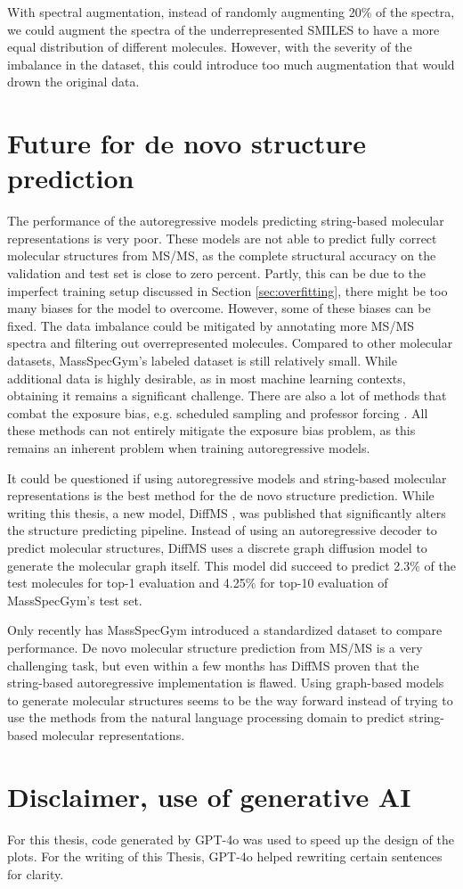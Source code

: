 With spectral augmentation, instead of randomly augmenting 20\% of the spectra, we could augment the spectra of the underrepresented SMILES to have a more equal distribution of different molecules.
However, with the severity of the imbalance in the dataset, this could introduce too much augmentation that would drown the original data.

\section{Future for de novo structure prediction}

The performance of the autoregressive models predicting string-based molecular representations is very poor.
These models are not able to predict fully correct molecular structures from \ac{MS/MS}, as the complete structural accuracy on the validation and test set is close to zero percent.
Partly, this can be due to the imperfect training setup discussed in Section \ref{sec:overfitting}, there might be too many biases for the model to overcome.
However, some of these biases can be fixed.
The data imbalance could be mitigated by annotating more \ac{MS/MS} spectra and filtering out overrepresented molecules.
Compared to other molecular datasets, MassSpecGym's labeled dataset is still relatively small.
While additional data is highly desirable, as in most machine learning contexts, obtaining it remains a significant challenge.
There are also a lot of methods that combat the exposure bias, e.g. scheduled sampling \cite{bengio2015scheduled} and professor forcing \cite{lamb2016professor}.
All these methods can not entirely mitigate the exposure bias problem, as this remains an inherent problem when training autoregressive models.

It could be questioned if using autoregressive models and string-based molecular representations is the best method for the de novo structure prediction.
While writing this thesis, a new model, DiffMS \cite{bohde2025diffms}, was published that significantly alters the structure predicting pipeline.
Instead of using an autoregressive decoder to predict molecular structures, DiffMS uses a discrete graph diffusion model to generate the molecular graph itself.
This model did succeed to predict 2.3\% of the test molecules for top-1 evaluation and 4.25\% for top-10 evaluation of MassSpecGym's test set.

Only recently has MassSpecGym introduced a standardized dataset to compare performance. De novo molecular structure prediction from \ac{MS/MS} is a very challenging task,
but even within a few months has DiffMS proven that the string-based autoregressive implementation is flawed.
Using graph-based models to generate molecular structures seems to be the way forward instead of trying to use the methods from the natural language processing domain to predict string-based molecular representations.

\section*{Disclaimer, use of generative AI}

For this thesis, code generated by GPT-4o was used to speed up the design of the plots.
For the writing of this Thesis, GPT-4o helped rewriting certain sentences for clarity.